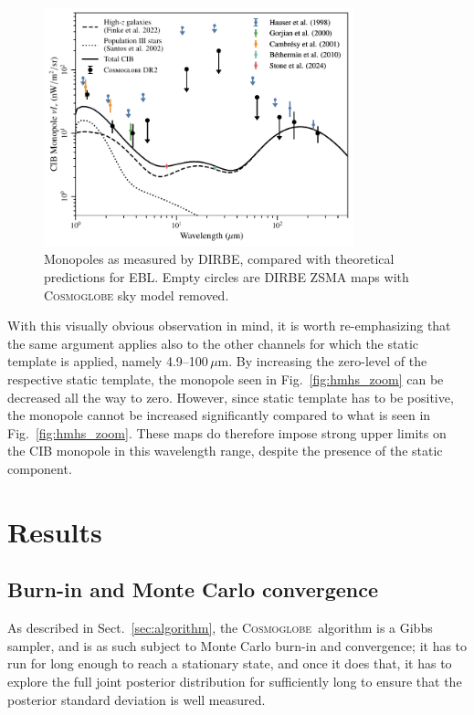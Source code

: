 \documentclass{aa}
\newcommand{\cosmoglobe}{\textsc{Cosmoglobe}}
\begin{document}
\begin{figure}
	\centering
	\includegraphics[width=0.8\textwidth]{figs/CIB_mono.pdf}
	\caption{Monopoles as measured by DIRBE, compared with theoretical predictions for EBL. Empty circles are DIRBE ZSMA maps with \textsc{Cosmoglobe} sky model removed.}
	\label{fig: EBL_monopoles}
\end{figure}


With this visually obvious observation in mind, it is worth
re-emphasizing that the same argument applies also to the other
channels for which the static template is applied, namely
4.9--100$\,\mu\mathrm{m}$. By increasing the zero-level of the
respective static template, the monopole seen in
Fig.~\ref{fig:hmhs_zoom} can be decreased all the way to
zero. However, since static template has to be positive, the monopole
cannot be increased significantly compared to what is seen in
Fig.~\ref{fig:hmhs_zoom}. These maps do therefore impose strong upper
limits on the CIB monopole in this wavelength range, despite the
presence of the static component.


\section{Results}
\label{sec:results}

\subsection{Burn-in and Monte Carlo convergence}

As described in Sect.~\ref{sec:algorithm}, the \cosmoglobe\ algorithm is a
Gibbs sampler, and is as such subject to Monte Carlo burn-in and
convergence; it has to run for long enough to reach a stationary
state, and once it does that, it has to explore the full joint
posterior distribution for sufficiently long to ensure that the
posterior standard deviation is well measured.
\end{document}
